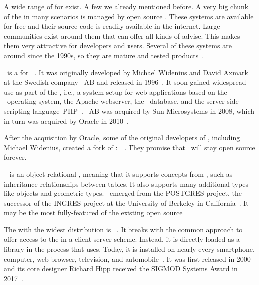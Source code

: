 %
\label{sec:software}%
%
A wide range of  for  exist.
A few we already mentioned before.%
%
%
A very big chunk of the  in many scenarios is managed by open source .
These systems are available for free and their source code is readily available in the internet.
Large communities exist around them that can offer all kinds of advise.
This makes them very attractive for developers and users.
Several of these systems are around since the 1990s, so they are mature and tested products~\cite{C20245YOQ}.

\mysql\ is a  for ~\cite{WAM2002MRMDFTS,TA2024DDAMWPAM,BT2021HPM,RGS2021BTOTONAMDFPC,D2015LMAM}.
It was originally developed by Michael Widenius and David Axmark at the Swedish company \mysql~AB and released in 1996~\cite{C20245YOQ}.
It soon gained widespread use as part of the \lampStack, i.e., a system setup for web applications based on the \linux\ operating system, the Apache webserver, the \mysql\ database, and the server-side scripting language~PHP~\cite{C2022HAFTLS,H2020ULU2E}.
\mysql~AB was acquired by Sun Microsystems in 2008, which in turn was acquired by Oracle in 2010~\cite{C20245YOQ}.

After the acquisition by Oracle, some of the original developers of \mysql, including Michael Widenius, created a fork of \mysql:~\mariadb~\cite{R2014MM,B2019LTMEELFFSAA,D2015LMAM,AA2018QAWMV1ITSQ,AA2018QAWMV2IDQ}.
They promise that \mariadb\ will stay open source forever.

\postgresql~\cite{TA2024DDAMWPAM,FP2023LP,OH2017PUAR,B2024PELUYDW} is an object-relational , meaning that it supports concepts from , such as inheritance relationships between tables.
It also supports many additional types like  objects and geometric types.
\postgresql\ emerged from the POSTGRES project, the successor of the INGRES project at the University of Berkeley in California~\cite{C20245YOQ}.
It may be the most fully-featured of the existing open source  

The   with the widest distribution is \sqlite~\cite{WB2019RHSOOS,GPBHKP2022SPPAF,C20245YOQ}.
It breaks with the common approach to offer access to the  in a client-server scheme.
Instead, it is directly loaded as a library in the process that uses.
Today, it is installed on nearly every smartphone, computer, web browser, television, and automobile~\cite{WB2019RHSOOS,GPBHKP2022SPPAF,C20245YOQ}.
It was first released in 2000 and its core designer Richard Hipp received the SIGMOD Systems Award in 2017~\cite{C20245YOQ}.

